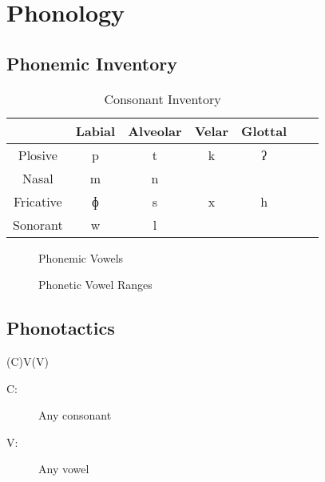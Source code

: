 \chapter{Phonology}

\section{Phonemic Inventory}
\begin{table}[ht]
  \centering
  \begin{tabular}{*{7}{c}}
    \toprule
              & Labial & Alveolar & Velar & Glottal \\\midrule
    Plosive   & p      & t        & k     & ʔ       \\
    Nasal     & m      & n        &       &         \\
    Fricative & ɸ      & s        & x     & h       \\
    Sonorant  & w      & l        &       &         \\
    \bottomrule
  \end{tabular}
  \caption{Consonant Inventory}
  \label{table:consonants}
\end{table}


\begin{figure}[ht]
  \centering
  \begin{vowel}
  \end{vowel}
  \caption{Phonemic Vowels}
  \label{table:vowel_phonemes}
\end{figure}

\begin{figure}[ht]
  \centering
  \begin{vowel}
  \end{vowel}
  \caption{Phonetic Vowel Ranges}
  \label{table:vowel_phones}
\end{figure}

\section{Phonotactics}\label{sec:phonotactics}

(C)V(V)
\begin{description}
  \item[C:] Any consonant
  \item[V:] Any vowel
\end{description}

